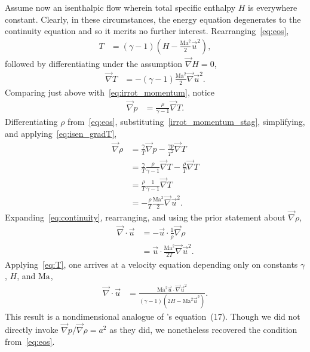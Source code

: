 \documentclass[letterpaper,11pt,nointlimits,reqno]{amsart}
\newcommand{\Mach}[1][]{\mbox{Ma}_{#1}}
\begin{document}
Assume now an isenthalpic flow wherein total specific enthalpy $H$ is
everywhere constant. Clearly, in these circumstances, the energy equation
degenerates to the continuity equation and so it merits no further interest.
Rearranging~\eqref{eq:eos},
\begin{align}
  T &= \left(\gamma-1\right)\left(H - \frac{\Mach^2}{2}\vec{u}^2\right),
  \label{eq:T}
\end{align}
followed by differentiating under the assumption $\vec{\nabla}H=0$,
\begin{align}
  \vec{\nabla} T &= -\left(\gamma-1\right)\frac{\Mach^2}{2}\vec{\nabla}\vec{u}^2.
  \label{eq:isen_gradT}
\end{align}
Comparing just above with~\eqref{eq:irrot_momentum}, notice
\begin{align}
  \vec{\nabla}p &= \frac{\rho}{\gamma-1}\vec{\nabla}T.
  \label{irrot_momentum_stag}
\end{align}
Differentiating $\rho$ from~\eqref{eq:eos},
substituting~\eqref{irrot_momentum_stag}, simplifying,
and applying~\eqref{eq:isen_gradT},
\begin{align}
  \vec{\nabla}\rho
  &=
  \frac{\gamma}{T} \vec{\nabla}p
  -
  \frac{\gamma p}{T^2} \vec{\nabla}T
\\&=
  \frac{\gamma}{T} \frac{\rho}{\gamma-1} \vec{\nabla}T
  -
  \frac{\rho}{T} \vec{\nabla}T
\\&=
  \frac{\rho}{T}
  \frac{1}{\gamma-1}
  \vec{\nabla}T
\\&=
  -
  \frac{\rho}{T}
  \frac{\Mach^2}{2}\vec{\nabla}\vec{u}^2.
  \label{eq:rho}
\end{align}
Expanding~\eqref{eq:continuity}, rearranging, and using the prior statement
about $\vec{\nabla}\rho$,
\begin{align}
  \vec{\nabla}\cdot\vec{u}
  &= -\vec{u}\cdot\frac{1}{\rho}\vec{\nabla}\rho
\\
  &= \vec{u}\cdot \frac{\Mach^2}{2T}\vec{\nabla}\vec{u}^2.
\end{align}
Applying~\eqref{eq:T}, one arrives at a velocity equation depending
only on constants $\gamma$, $H$, and $\Mach$,
\begin{align}
  \vec{\nabla}\cdot\vec{u}
  &= \frac{\Mach^2 \vec{u}\cdot \vec{\nabla}\vec{u}^2}
          {\left(\gamma-1\right)\left(2H - \Mach^2 \vec{u}^2\right)}.
  \label{eq:gibbsresult}
\end{align}
This result is a nondimensional analogue of \citeauthor{Saad2011Coordinate}'s
equation~(17).  Though we did not directly invoke $\vec{\nabla}p /
\vec{\nabla}\rho = a^2$ as they did, we nonetheless recovered the condition
from~\eqref{eq:eos}.
\end{document}
